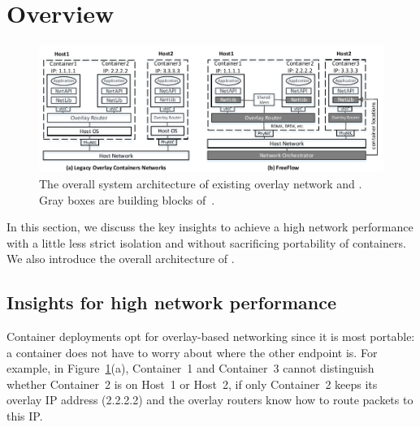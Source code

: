 \section{Overview} \label{sec:overview}

\begin{figure}[t!] 
     \centering 
     \includegraphics[width=7in]{figures/system-arch.pdf} 
    \caption{\label{fig:sysarch} The overall system architecture of existing overlay network and \sysname. Gray boxes are building blocks of~\sysname.}
\end{figure} 

In this section, we discuss the key insights to achieve a high network
performance with a little less strict isolation and without sacrificing portability of containers. We also introduce the overall architecture 
of \sysname.


\subsection{Insights for high network performance}

Container deployments opt for overlay-based networking since it is most
portable: a container does not have to worry about where the other endpoint is.
For example, in Figure~\ref{fig:sysarch}(a), Container~1 and Container~3 cannot
distinguish whether Container~2 is on Host~1 or Host~2, if only Container~2
keeps its overlay IP address (2.2.2.2) and the overlay routers know how to
route packets to this IP. 

